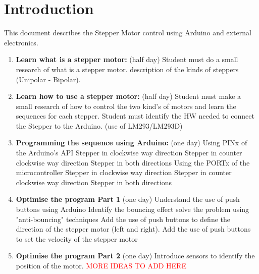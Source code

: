 \chapter*{Introduction}
\label{chap: Introduction}
This document describes the Stepper Motor control using Arduino and external electronics.




\begin{enumerate}
  \item \textbf{Learn what is a stepper motor:}  (half day)
  	\subitem Student must do a small research of what is a stepper motor.
  	\subitem description of the kinds of steppers (Unipolar - Bipolar).
  \item \textbf{Learn how to use a stepper motor:} (half day)
  	\subitem Student must make a small research of how to control the two kind’s of motors and learn the sequences for each stepper.
  	\subitem Student must identify the HW needed to connect the Stepper to the Arduino. (use of LM293/LM293D)
  \item \textbf{Programming the sequence using Arduino:} (one day)
  	\subitem Using PINx of the Arduino's API
  		\subsubitem Stepper in clockwise way direction
  		\subsubitem Stepper in counter clockwise way direction
  		\subsubitem Stepper in both directions
  	\subitem Using the PORTx of the microcontroller
  		\subsubitem Stepper in clockwise way direction
  		\subsubitem Stepper in counter clockwise way direction
  		\subsubitem Stepper in both directions
  \item \textbf{Optimise the program Part 1} (one day)
	\subitem Understand the use of push buttons using Arduino
		\subsubitem Identify the bouncing effect
		\subsubitem solve the problem using "anti-bouncing" techniques
  	\subitem Add the use of push buttons to define the direction of the stepper motor (left and right).
  	\subitem Add the use of push buttons to set the velocity of the stepper motor
  \item \textbf{Optimise the program Part 2} (one day)
  	\subitem Introduce sensors to identify the position of the motor.
  	\subitem \textcolor{red}{MORE IDEAS TO ADD HERE}


\end{enumerate}
